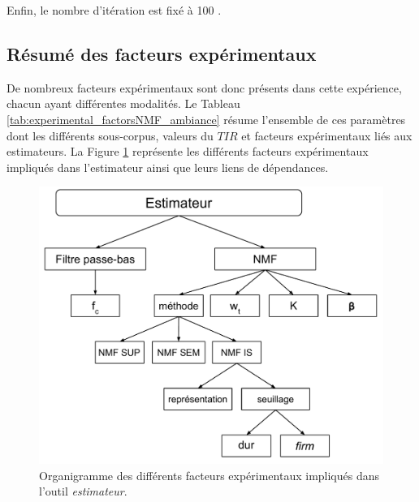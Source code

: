 Enfin, le nombre d'itération est fixé à 100 .

\subsection{Résumé des facteurs expérimentaux}

De nombreux facteurs expérimentaux sont donc présents dans cette expérience, chacun ayant différentes modalités. Le Tableau \ref{tab:experimental_factorsNMF_ambiance} résume l'ensemble de ces paramètres dont les différents sous-corpus, valeurs du $TIR$ et facteurs expérimentaux liés aux estimateurs. La Figure \ref{fig:organigramme} représente les différents facteurs expérimentaux impliqués dans l'estimateur ainsi que leurs liens de dépendances.

\begin{figure}[h]
\centering
\includegraphics[width=0.8\linewidth]{./figures/NMF/facteurs_exp.pdf}
\caption{Organigramme des différents facteurs expérimentaux impliqués dans l'outil \textit{estimateur}.}
\label{fig:organigramme}
\end{figure}

